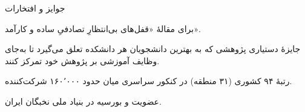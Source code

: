 \documentclass[11pt]{article}
\begin{document}
\begin{faSection}{جوایز و افتخارات}

برای مقالۀ «قفل‌های بی‌انتظارِ تصادفیِ ساده و کارآمد».

\vspace{0.4em}
جایزۀ دستیاری پژوهشی که به بهترین دانشجویان هر دانشکده تعلق می‌گیرد تا به‌جای وظایف آموزشی بر پژوهش خود تمرکز کنند.

\vspace{0.4em}
رتبۀ ۹۴ کشوری (۳۱ منطقه) در کنکور سراسری میان حدود ۱۶۰٬۰۰۰ شرکت‌کننده.

\vspace{0.4em}
عضویت و بورسیه در بنیاد ملی نخبگان ایران.

\end{faSection}
\end{document}
